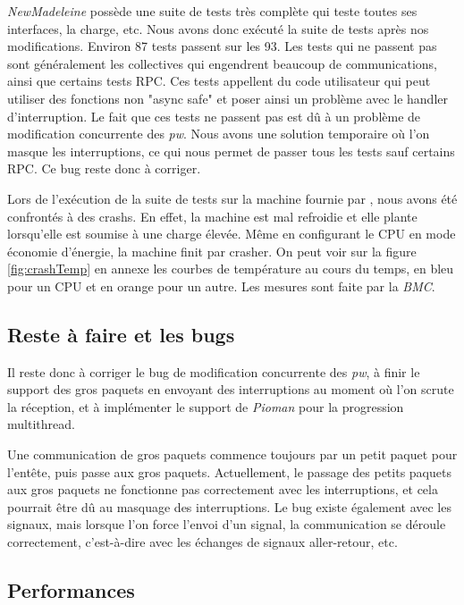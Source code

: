 \emph{NewMadeleine} possède une suite de tests très complète qui teste toutes ses interfaces, la charge, etc.
Nous avons donc exécuté la suite de tests après nos modifications. Environ 87 tests passent sur les 93.
Les tests qui ne passent pas sont généralement les collectives qui engendrent beaucoup de communications, ainsi que certains tests RPC.
Ces tests appellent du code utilisateur qui peut utiliser des fonctions non "async safe" et poser ainsi un problème avec le handler d'interruption.
Le fait que ces tests ne passent pas est dû à un problème de modification concurrente des \emph{pw}.
Nous avons une solution temporaire où l'on masque les interruptions, ce qui nous permet de passer tous les tests sauf certains RPC.
Ce bug reste donc à corriger.

Lors de l'exécution de la suite de tests sur la machine fournie par \atos{}, nous avons été confrontés à des crashs.
En effet, la machine est mal refroidie et elle plante lorsqu'elle est soumise à une charge élevée.
Même en configurant le CPU en mode économie d'énergie, la machine finit par crasher.
On peut voir sur la figure \ref{fig:crashTemp} en annexe les courbes de température au cours du temps,
en bleu pour un CPU et en orange pour un autre.
Les mesures sont faite par la \emph{BMC}. %

\subsection{Reste à faire et les bugs}

Il reste donc à corriger le bug de modification concurrente des \emph{pw},
à finir le support des gros paquets en envoyant des interruptions au moment où l'on scrute la réception,
et à implémenter le support de \emph{Pioman} pour la progression multithread.

Une communication de gros paquets commence toujours par un petit paquet pour l'entête, puis passe aux gros paquets.
Actuellement, le passage des petits paquets aux gros paquets ne fonctionne pas correctement avec les interruptions,
et cela pourrait être dû au masquage des interruptions.
Le bug existe également avec les signaux, mais lorsque l'on force l'envoi d'un signal,
la communication se déroule correctement, c'est-à-dire avec les échanges de signaux aller-retour, etc.

\subsection{Performances}

